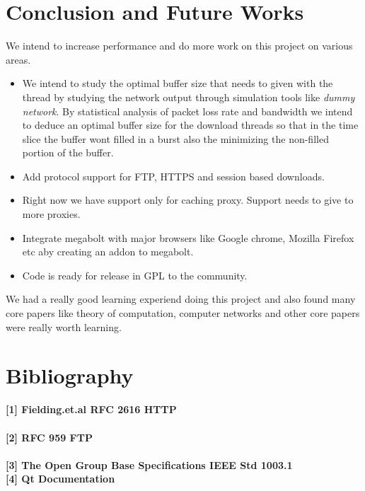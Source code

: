 \documentclass[pdftex,12pt,a4paper,pdfencoding=unicode]{article}
\begin{document}
\begin{onehalfspace}
       \section{Conclusion and Future Works}
       We intend to increase performance and do more work on this project on various areas.
       \begin{itemize}
       \item We intend to study the optimal buffer size that needs to given with the thread by studying the network output through
         simulation tools like \emph{ dummy network}. By statistical analysis of packet loss rate and bandwidth we intend to deduce an
         optimal buffer size for the download threads so that in the time slice the buffer wont filled in a burst also the minimizing
         the non-filled portion of the buffer.
       \item Add protocol support for FTP, HTTPS and session based downloads.
       \item Right now we have support only for caching proxy. Support needs to give to more proxies.
       \item Integrate megabolt with major browsers like Google chrome, Mozilla Firefox etc aby creating an addon to megabolt.
       \item Code is ready for release in GPL to the community.
       \end{itemize}
       
       We had a really good learning experiend doing this project and also found many core papers like theory of computation, computer
       networks and other core papers were really worth learning.
       
       \newpage
       \section*{Bibliography}
                {\bf [1] Fielding.et.al RFC 2616 HTTP}\\ \href{http://tools.ietf.org/html/rfc2616}\\
                {\bf [2] RFC 959 FTP} \\ \href {http://tools.ietf.org/html/rfc959}\\
                {\bf [3] The Open Group Base Specifications IEEE Std 1003.1}\\
                {\bf [4] Qt Documentation}\\ \href{http://doc.qt.nokia.com/latest/}\\
                
\end{onehalfspace}
\end{document}
